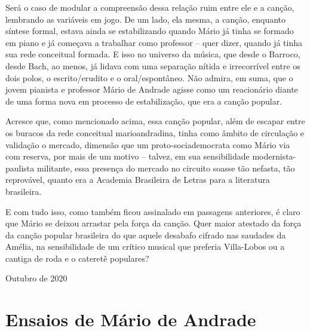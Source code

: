 Será o caso de modular a compreensão dessa relação ruim entre ele e a
canção, lembrando as variáveis em jogo. De um lado, ela mesma, a canção,
enquanto síntese formal, estava ainda se estabilizando quando Mário já
tinha se formado em piano e já começava a trabalhar como professor --
quer dizer, quando já tinha sua rede conceitual formada. E isso no
universo da música, que desde o Barroco, desde Bach, ao menos, já lidava
com uma separação nítida e irrecorrível entre os dois polos, o
escrito/erudito e o oral/espontâneo. Não admira, em suma, que o jovem
pianista e professor Mário de Andrade agisse como um reacionário diante
de uma forma nova em processo de estabilização, que era a canção
popular.

Acresce que, como mencionado acima, essa canção popular, além de escapar
entre os buracos da rede conceitual marioandradina, tinha como âmbito de
circulação e validação o mercado, dimensão que um proto-sociademocrata
como Mário via com reserva, por mais de um motivo -- talvez, em sua
sensibilidade modernista-paulista militante, essa presença do mercado no
circuito soasse tão nefasta, tão reprovável, quanto era a Academia
Brasileira de Letras para a literatura brasileira.

E com tudo isso, como também ficou assinalado em passagens anteriores, é
claro que Mário se deixou arrastar pela força da canção. Quer maior
atestado da força da canção popular brasileira do que aquele desabafo
cifrado nas saudades da Amélia, na sensibilidade de um crítico musical
que preferia Villa-Lobos ou a cantiga de roda e o cateretê populares?

\begin{flushright}
Outubro de 2020
\end{flushright}

\part{Ensaios de Mário de Andrade}



